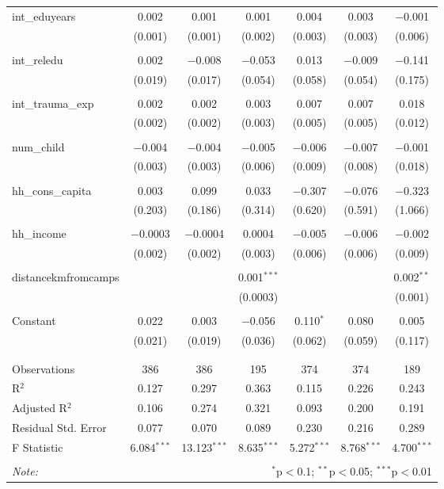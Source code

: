 \begin{table}[H]
\begin{tabular}{@{\extracolsep{4pt}}lcccccc}
 int\_eduyears & 0.002 & 0.001 & 0.001 & 0.004 & 0.003 & $-$0.001 \\ 
  & (0.001) & (0.001) & (0.002) & (0.003) & (0.003) & (0.006) \\ 
  & & & & & & \\ 
 int\_reledu & 0.002 & $-$0.008 & $-$0.053 & 0.013 & $-$0.009 & $-$0.141 \\ 
  & (0.019) & (0.017) & (0.054) & (0.058) & (0.054) & (0.175) \\ 
  & & & & & & \\ 
 int\_trauma\_exp & 0.002 & 0.002 & 0.003 & 0.007 & 0.007 & 0.018 \\ 
  & (0.002) & (0.002) & (0.003) & (0.005) & (0.005) & (0.012) \\ 
  & & & & & & \\ 
 num\_child & $-$0.004 & $-$0.004 & $-$0.005 & $-$0.006 & $-$0.007 & $-$0.001 \\ 
  & (0.003) & (0.003) & (0.006) & (0.009) & (0.008) & (0.018) \\ 
  & & & & & & \\ 
 hh\_cons\_capita & 0.003 & 0.099 & 0.033 & $-$0.307 & $-$0.076 & $-$0.323 \\ 
  & (0.203) & (0.186) & (0.314) & (0.620) & (0.591) & (1.066) \\ 
  & & & & & & \\ 
 hh\_income & $-$0.0003 & $-$0.0004 & 0.0004 & $-$0.005 & $-$0.006 & $-$0.002 \\ 
  & (0.002) & (0.002) & (0.003) & (0.006) & (0.006) & (0.009) \\ 
  & & & & & & \\ 
 distancekmfromcamps &  &  & 0.001$^{***}$ &  &  & 0.002$^{**}$ \\ 
  &  &  & (0.0003) &  &  & (0.001) \\ 
  & & & & & & \\ 
 Constant & 0.022 & 0.003 & $-$0.056 & 0.110$^{*}$ & 0.080 & 0.005 \\ 
  & (0.021) & (0.019) & (0.036) & (0.062) & (0.059) & (0.117) \\ 
  & & & & & & \\ 
\hline \\[-1.8ex] 
Observations & 386 & 386 & 195 & 374 & 374 & 189 \\ 
R$^{2}$ & 0.127 & 0.297 & 0.363 & 0.115 & 0.226 & 0.243 \\ 
Adjusted R$^{2}$ & 0.106 & 0.274 & 0.321 & 0.093 & 0.200 & 0.191 \\ 
Residual Std. Error & 0.077 & 0.070 & 0.089 & 0.230 & 0.216 & 0.289 \\ 
F Statistic & 6.084$^{***}$ & 13.123$^{***}$ & 8.635$^{***}$ & 5.272$^{***}$ & 8.768$^{***}$ & 4.700$^{***}$ \\ 
\hline 
\hline \\[-1.8ex] 
\textit{Note:}  & \multicolumn{6}{r}{$^{*}$p$<$0.1; $^{**}$p$<$0.05; $^{***}$p$<$0.01} \\ 
\end{tabular} 
\end{table} 
